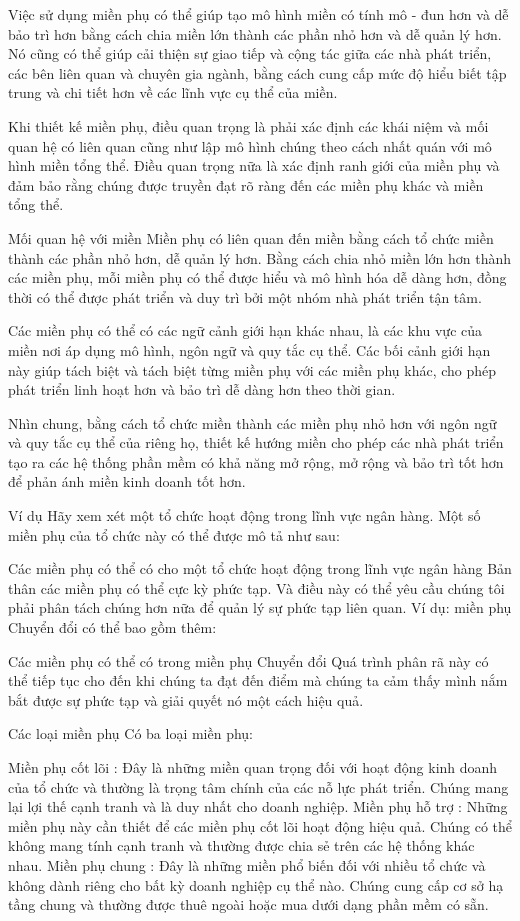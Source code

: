 Việc sử dụng miền phụ có thể giúp tạo mô hình miền có tính mô - đun hơn và dễ bảo trì hơn bằng cách chia miền lớn thành các phần nhỏ hơn và dễ quản lý hơn. Nó cũng có thể giúp cải thiện sự giao tiếp và cộng tác giữa các nhà phát triển, các bên liên quan và chuyên gia ngành, bằng cách cung cấp mức độ hiểu biết tập trung và chi tiết hơn về các lĩnh vực cụ thể của miền.

Khi thiết kế miền phụ, điều quan trọng là phải xác định các khái niệm và mối quan hệ có liên quan cũng như lập mô hình chúng theo cách nhất quán với mô hình miền tổng thể. Điều quan trọng nữa là xác định ranh giới của miền phụ và đảm bảo rằng chúng được truyền đạt rõ ràng đến các miền phụ khác và miền tổng thể.

Mối quan hệ với miền
Miền phụ có liên quan đến miền bằng cách tổ chức miền thành các phần nhỏ hơn, dễ quản lý hơn. Bằng cách chia nhỏ miền lớn hơn thành các miền phụ, mỗi miền phụ có thể được hiểu và mô hình hóa dễ dàng hơn, đồng thời có thể được phát triển và duy trì bởi một nhóm nhà phát triển tận tâm.

Các miền phụ có thể có các ngữ cảnh giới hạn khác nhau, là các khu vực của miền nơi áp dụng mô hình, ngôn ngữ và quy tắc cụ thể. Các bối cảnh giới hạn này giúp tách biệt và tách biệt từng miền phụ với các miền phụ khác, cho phép phát triển linh hoạt hơn và bảo trì dễ dàng hơn theo thời gian.

Nhìn chung, bằng cách tổ chức miền thành các miền phụ nhỏ hơn với ngôn ngữ và quy tắc cụ thể của riêng họ, thiết kế hướng miền cho phép các nhà phát triển tạo ra các hệ thống phần mềm có khả năng mở rộng, mở rộng và bảo trì tốt hơn để phản ánh miền kinh doanh tốt hơn.

Ví dụ
Hãy xem xét một tổ chức hoạt động trong lĩnh vực ngân hàng. Một số miền phụ của tổ chức này có thể được mô tả như sau:

Các miền phụ có thể có cho một tổ chức hoạt động trong lĩnh vực ngân hàng
Bản thân các miền phụ có thể cực kỳ phức tạp. Và điều này có thể yêu cầu chúng tôi phải phân tách chúng hơn nữa để quản lý sự phức tạp liên quan. Ví dụ: miền phụ Chuyển đổi có thể bao gồm thêm:

Các miền phụ có thể có trong miền phụ Chuyển đổi
Quá trình phân rã này có thể tiếp tục cho đến khi chúng ta đạt đến điểm mà chúng ta cảm thấy mình nắm bắt được sự phức tạp và giải quyết nó một cách hiệu quả.

Các loại miền phụ
Có ba loại miền phụ:

Miền phụ cốt lõi : Đây là những miền quan trọng đối với hoạt động kinh doanh của tổ chức và thường là trọng tâm chính của các nỗ lực phát triển. Chúng mang lại lợi thế cạnh tranh và là duy nhất cho doanh nghiệp.
Miền phụ hỗ trợ : Những miền phụ này cần thiết để các miền phụ cốt lõi hoạt động hiệu quả. Chúng có thể không mang tính cạnh tranh và thường được chia sẻ trên các hệ thống khác nhau.
Miền phụ chung : Đây là những miền phổ biến đối với nhiều tổ chức và không dành riêng cho bất kỳ doanh nghiệp cụ thể nào. Chúng cung cấp cơ sở hạ tầng chung và thường được thuê ngoài hoặc mua dưới dạng phần mềm có sẵn.


